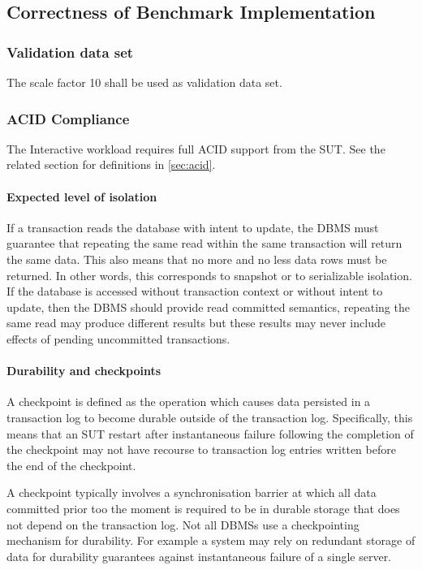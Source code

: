 \subsection{Correctness of Benchmark Implementation}

\subsubsection{Validation data set}
\label{sec:validation-data-set}
The scale factor 10 shall be used as validation data set.

\subsubsection{ACID Compliance}
\label{sec:snb-acid}

The Interactive workload requires full ACID support from the SUT.
See the related section for definitions in \autoref{sec:acid}.

\paragraph{Expected level of isolation}
If a transaction reads the database with intent to update, the DBMS must guarantee that repeating the same read within the same transaction will return the same data. This also means that no more and no less data rows must be returned. In other words, this corresponds to snapshot or to serializable isolation. If the database is accessed without transaction context or without intent to update, then the DBMS should provide read committed semantics, \eg repeating the same read may produce different results but these results may never include effects of pending uncommitted transactions.

\paragraph{Durability and checkpoints}

A checkpoint is defined as the operation which causes data persisted in a transaction log to become durable outside of the transaction log. Specifically, this means that an SUT restart after instantaneous failure following the completion of the checkpoint may not have recourse to transaction log entries written before the end of the checkpoint.

A checkpoint typically involves a synchronisation barrier at which all data committed prior too the moment is required to be in durable storage that does not depend on the transaction log.
Not all DBMSs use a checkpointing mechanism for durability. For example a system may rely on redundant storage of data for durability guarantees against instantaneous failure of a single server.


